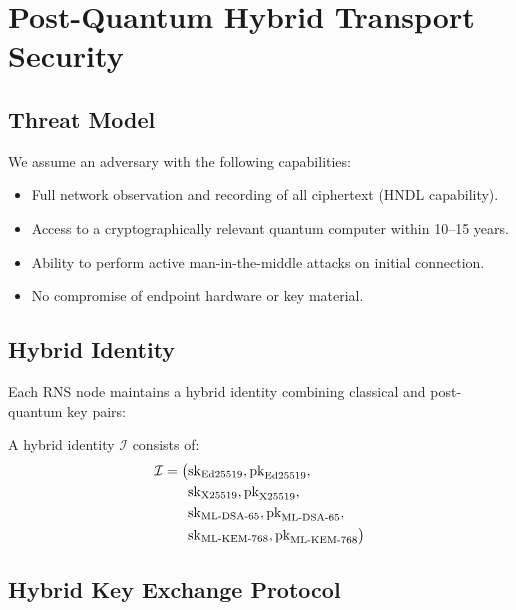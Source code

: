 \documentclass[11pt,letterpaper]{article}
\begin{document}
\section{Post-Quantum Hybrid Transport Security}

\subsection{Threat Model}

We assume an adversary with the following capabilities:
\begin{itemize}
\item Full network observation and recording of all ciphertext (HNDL capability).
\item Access to a cryptographically relevant quantum computer within 10--15 years.
\item Ability to perform active man-in-the-middle attacks on initial connection.
\item No compromise of endpoint hardware or key material.
\end{itemize}

\subsection{Hybrid Identity}

Each RNS node maintains a hybrid identity combining classical and post-quantum key pairs:

\begin{definition}
A hybrid identity $\mathcal{I}$ consists of:
\begin{align}
\mathcal{I} = \big(&\text{sk}_{\text{Ed25519}}, \text{pk}_{\text{Ed25519}}, \notag \\
                    &\text{sk}_{\text{X25519}}, \text{pk}_{\text{X25519}}, \notag \\
                    &\text{sk}_{\text{ML-DSA-65}}, \text{pk}_{\text{ML-DSA-65}}, \notag \\
                    &\text{sk}_{\text{ML-KEM-768}}, \text{pk}_{\text{ML-KEM-768}}\big)
\end{align}
\end{definition}

\subsection{Hybrid Key Exchange Protocol}
\end{document}
